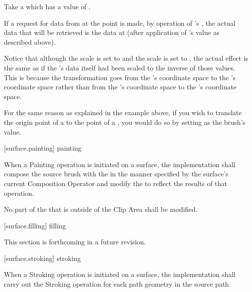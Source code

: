 \pnum
\enterexample
Take a  which has a  value of .

\pnum
If a request for data from  at the point  is made, by operation of 's , the actual data that will be retrieved is the data at  (after application of 's  value as described above).

\pnum
Notice that although the \xaxis scale is set to  and the \yaxis scale is set to , the actual effect is the same as if the 's data itself had been scaled to the inverse of those values. This is because the transformation goes from the 's coordinate space to the 's coordinate space rather than from the 's coordinate space to the 's coordinate space.
\exitexample

\pnum
\enternote
For the same reason as explained in the example above, if you wish to translate the origin point of a  to the point  of a , you would do so by setting  as the brush's  value.
\exitnote

 [surface.painting] { painting}

\pnum
When a Painting operation is initiated on a surface, the implementation shall compose the source brush with the \underlyingsurface in the manner specified by the surface's current Composition Operator and modify the \underlyingsurface to reflect the results of that operation.

\pnum
No part of the \underlyingsurface that is outside of the Clip Area shall be modified.

 [surface.filling] { filling}

\pnum
This section is forthcoming in a future revision.


 [surface.stroking] { stroking}

\pnum
When a Stroking operation is initiated on a surface, the implementation shall carry out the Stroking operation for each path geometry in the source path.

